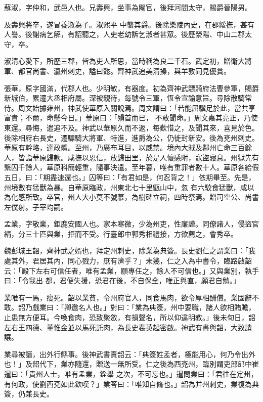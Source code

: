 \begin{pinyinscope}
 蘇淑，字仲和，武邑人也。兄壽興，坐事為閹官，後拜河間太守，賜爵晉陽男。



 及壽興將卒，遂冒養淑為子。淑熙平
 中襲其爵。後除樂陵內史，在郡綏撫，甚有人譽。後謝病乞解，有詔聽之，人吏老幼訴乞淑者甚眾。後歷滎陽、中山二郡太守，卒。



 淑清心愛下，所歷三郡，皆為吏人所思，當時稱為良二千石。武定初，贈衛大將軍、都官尚書、瀛州刺史，謚曰懿。齊神武追美清操，與羊敦同見優賞。



 張華，原字國滿，代郡人也。少明敏，有器度。初為齊神武驃騎府法曹參軍，賜爵新城伯，累遷大丞相府屬。深被親待，每號令三軍，恆令宣諭意旨。尋除散騎常侍。周文始據雍州，神武使華原入關說焉。周文謂曰：「若能屈驥足於此，當共享富貴；不爾，命懸今日。」華原曰：「殞首而已，
 不敢聞命。」周文嘉其亮正，乃使東還。尋悔，遣追不及。神武以華原久而不返，每歎惜之，及聞其來，喜見於色。後除相府右長史，遷驃騎大將軍、特進，進爵為公，仍徙封新安。後為兗州刺史。華原有幹略，達政體。至州，乃廣布耳目，以威禁。境內大賊及鄰州亡命三百餘人，皆詣華原歸款。咸撫以恩信，放歸田里，於是人懷感附，寇盜寢息。州獄先有繫囚千餘人，華原科簡輕重，隨事決遣。至年暮，唯有重罪者數十人。華原各給假五日，曰：「期盡速還也。」囚等曰：「有君如是，何忍背之！」依期畢至。先是，州境數有猛獸為暴。自華原臨政，州東北七十里甑山中，忽
 有六駮食猛獸，咸以為化感所致。卒官，州人大小莫不號慕，為樹碑立祠，四時祭焉。贈司空公、尚書左僕射。子宰均嗣。



 孟業，字敬業，鉅鹿安國人也。家本寒微，少為州吏，性廉謹。同僚諸人，侵盜官絹，分三十匹與業，拒而不受。行臺郎中郭秀相禮接，方欲薦之，會秀卒。



 魏彭城王韶，齊神武之婿也，拜定州刺史，除業為典簽。長史劉仁之謂業曰：「我處其外，君居其內，同心戮力，庶有濟乎？」未幾，仁之入為中書令，臨路啟韶云：「殿下左右可信任者，唯有孟業，願專任之，餘人不可信也。」又與業別，執手曰：「令我出
 都，君便失援，恐君在後，不自保全，唯正與直，願君自勉。」



 業唯有一馬，瘦死。韶以業貧，令州府官人，同食馬肉，欲令厚相酬償。業固辭不敢。韶乃戲業曰：「卿邀名人也。」對曰：「業為典簽，州中要職，諸人欲相賄贍，止患無方便耳。今喚食肉，恐致聚斂，有損聲名，所以仰違明教。」後未旬日，韶左右王四德、董惟金並以馬死託肉，為長史裴英起密啟。神武有書與韶，大致誚讓。



 業尋被譖，出外行縣事。後神武書責韶云：「典簽姓孟者，極能用心，何乃令出外也！」及韶代下，業亦隨還，贈送一無所受。仁之後為西兗州，臨別謂吏部郎中崔暹曰：「貴州人士，唯有孟業，銓舉
 之次，不可忘也。」暹問業曰：「君往在定州，有何政，使劉西兗如此欽嘆？」業答曰：「唯知自脩也。」韶為并州刺史，業復為典簽，仍兼長史。




\end{pinyinscope}
